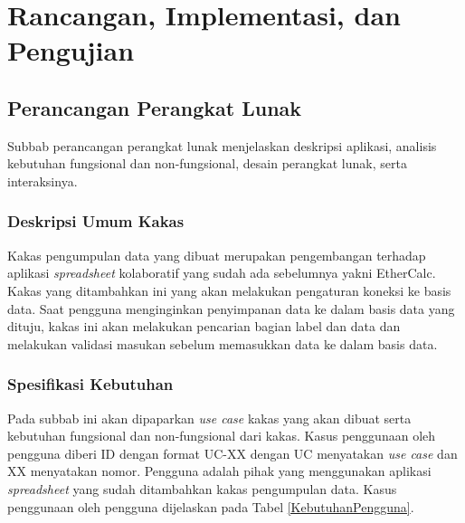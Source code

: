 \chapter{Rancangan, Implementasi, dan Pengujian}

\section{Perancangan Perangkat Lunak} \label{PerancanganPL}
Subbab perancangan perangkat lunak menjelaskan deskripsi aplikasi, analisis kebutuhan fungsional dan non-fungsional, desain perangkat lunak, serta interaksinya.

\subsection{Deskripsi Umum Kakas}
Kakas pengumpulan data yang dibuat merupakan pengembangan terhadap aplikasi \textit{spreadsheet} kolaboratif yang sudah ada sebelumnya yakni EtherCalc. Kakas yang ditambahkan ini yang akan melakukan pengaturan koneksi ke basis data. Saat pengguna menginginkan penyimpanan data ke dalam basis data yang dituju, kakas ini akan melakukan pencarian bagian label dan data dan melakukan validasi masukan sebelum memasukkan data ke dalam basis data.

\subsection{Spesifikasi Kebutuhan}
Pada subbab ini akan dipaparkan \textit{use case} kakas yang akan dibuat serta kebutuhan fungsional dan non-fungsional dari kakas. Kasus penggunaan oleh pengguna diberi ID dengan format UC-XX dengan UC menyatakan \textit{use case} dan XX menyatakan nomor. Pengguna adalah pihak yang menggunakan aplikasi \textit{spreadsheet} yang sudah ditambahkan kakas pengumpulan data. Kasus penggunaan oleh pengguna dijelaskan pada Tabel \ref{KebutuhanPengguna}.

